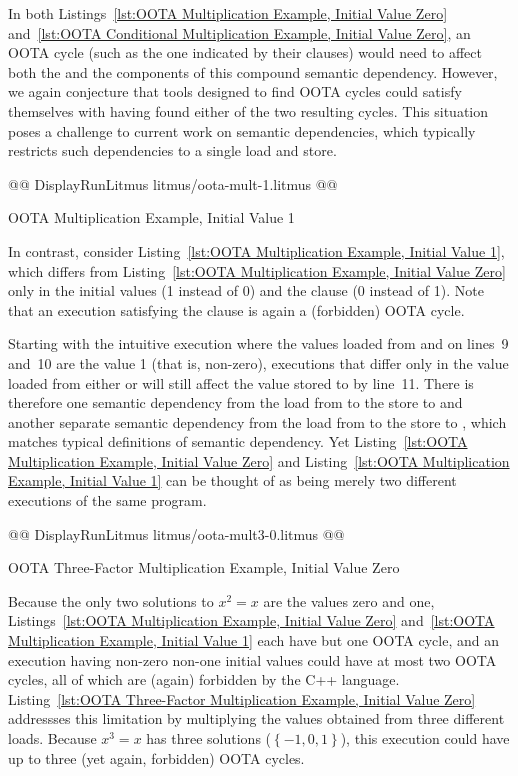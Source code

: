 \documentclass[10]{article}
\begin{document}
In both
Listings~\ref{lst:OOTA Multiplication Example, Initial Value Zero}
and~\ref{lst:OOTA Conditional Multiplication Example, Initial Value Zero},
an OOTA cycle (such as the one indicated by their  clauses)
would need to affect both the  and the  components of this
compound semantic dependency.
However, we again conjecture that tools designed to find OOTA cycles could
satisfy themselves with having found either of the two resulting cycles.
This situation poses a challenge to current work on semantic dependencies,
which typically restricts such dependencies to a single load and store.

\begin{listing}[tbp]
@@ DisplayRunLitmus litmus/oota-mult-1.litmus @@
\caption{OOTA Multiplication Example, Initial Value 1}
\label{lst:OOTA Multiplication Example, Initial Value 1}
\end{listing}

In contrast, consider
Listing~\ref{lst:OOTA Multiplication Example, Initial Value 1},
which differs from
Listing~\ref{lst:OOTA Multiplication Example, Initial Value Zero}
only in the initial values (1 instead of 0) and the 
clause (0 instead of 1).
Note that an execution satisfying the  clause is again
a (forbidden) OOTA cycle.

Starting with the intuitive execution where the values loaded from 
and  on lines~9 and~10 are the value 1 (that is, non-zero), executions
that differ only in the value loaded from either  or  will
still affect the value stored to  by line~11.
There is therefore one semantic dependency from the load from 
to the store to  and another separate semantic dependency from
the load from  to the store to , which matches typical
definitions of semantic dependency.
Yet
Listing~\ref{lst:OOTA Multiplication Example, Initial Value Zero}
and
Listing~\ref{lst:OOTA Multiplication Example, Initial Value 1}
can be thought of as being merely two different executions of the same
program.

\begin{listing}[tbp]
@@ DisplayRunLitmus litmus/oota-mult3-0.litmus @@
\caption{OOTA Three-Factor Multiplication Example, Initial Value Zero}
\label{lst:OOTA Three-Factor Multiplication Example, Initial Value Zero}
\end{listing}

Because the only two solutions to $x^2 = x$ are the values zero and one,
Listings~\ref{lst:OOTA Multiplication Example, Initial Value Zero}
and~\ref{lst:OOTA Multiplication Example, Initial Value 1}
each have but one OOTA cycle, and an execution having non-zero non-one
initial values could have at most two OOTA cycles, all of which are
(again) forbidden by the C++ language.
Listing~\ref{lst:OOTA Three-Factor Multiplication Example, Initial Value Zero}
addressses this limitation by multiplying the values obtained from three
different loads.
Because $x^3 = x$ has three solutions ($\left\{ -1, 0, 1 \right\}$),
this execution could have up to three (yet again, forbidden) OOTA cycles.
\end{document}
